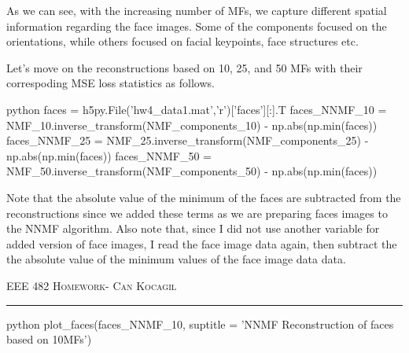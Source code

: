 \documentclass[12pt]{amsart}
\begin{document}
As we can see, with the increasing number of MFs, we capture different spatial information regarding the face images. Some of the components focused on the orientations, while others focused on  facial keypoints, face structures etc.

\bigskip
Let's move on the reconstructions based on 10, 25, and 50 MFs with their correspoding MSE loss statistics as follows.

\begin{mintedbox}{python}
faces = h5py.File('hw4_data1.mat','r')['faces'][:].T
faces_NNMF_10 = NMF_10.inverse_transform(NMF_components_10) - np.abs(np.min(faces))
faces_NNMF_25 = NMF_25.inverse_transform(NMF_components_25) - np.abs(np.min(faces))
faces_NNMF_50 = NMF_50.inverse_transform(NMF_components_50) - np.abs(np.min(faces))

\end{mintedbox}

Note that the absolute value of the minimum of the faces are subtracted from the reconstructions since we added these terms as we are preparing faces images to the NNMF algorithm. Also note that, since I did not use another variable for added version of face images, I read the face image data again, then subtract the the absolute value of the minimum values of the face image data data. 

\newpage
{\scshape EEE 482} \hfill {\scshape \large  Homework-\relax} \hfill {\scshape Can Kocagil}
\smallskip
\hrule
\vspace{2mm}

\begin{mintedbox}{python}
plot_faces(faces_NNMF_10, suptitle = 'NNMF Reconstruction of faces based on 10MFs')
\end{mintedbox}
\end{document}
